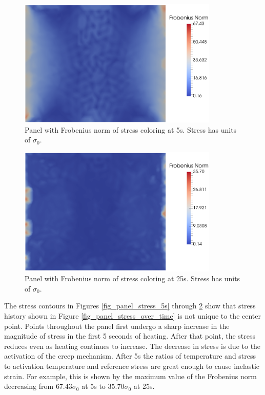 \documentclass[conf]{new-aiaa}
\begin{document}
\begin{figure}[H] 
  \centering
    \includegraphics[width=0.85\textwidth, keepaspectratio]
    {panel_stress_frobenius_norm_5s}
  \caption{ Panel with Frobenius norm of stress coloring at 5s.
            Stress has units of $\sigma_0$.}
  \label{fig_panel_stress_frobenius_5s}
\end{figure}

\begin{figure}[H] 
  \centering
    \includegraphics[width=0.85\textwidth, keepaspectratio]
    {panel_stress_forbenius_norm_25s}
  \caption{ Panel with Frobenius norm of stress coloring at 25s.
            Stress has units of $\sigma_0$.}
  \label{fig_panel_stress_frobenius_25s}
\end{figure}

\noindent
The stress contours in Figures \ref{fig_panel_stress_5s} through
\ref{fig_panel_stress_frobenius_25s} show that stress history 
shown in Figure \ref{fig_panel_stress_over_time} is not unique to 
the center point. 
Points throughout the panel first undergo a sharp increase in
the magnitude of stress in the first 5 seconds of heating. 
After that point, the stress reduces even as heating continues to increase.
The decrease in stress is due to the activation of the creep mechanism.
After 5s the ratios of temperature and stress to activation temperature
and reference stress are great enough to cause inelastic strain.
For example, this is shown by the maximum value of the Frobenius norm 
decreasing from $67.43\sigma_0$ at 5s to $35.70\sigma_0$ at 25s.
\end{document}
